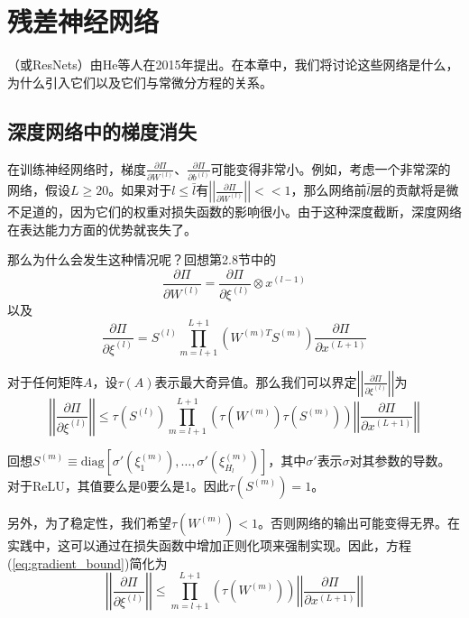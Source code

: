 \chapter{残差神经网络}
\label{chap:residual_networks}

（或ResNets）由He等人\cite{he2015}在2015年提出。在本章中，我们将讨论这些网络是什么，为什么引入它们以及它们与常微分方程的关系。

\section{深度网络中的梯度消失}
\label{sec:vanishing_gradients}

在训练神经网络时，梯度$\frac{\partial\Pi}{\partial W^{(l)}}$、$\frac{\partial\Pi}{\partial b^{(l)}}$可能变得非常小。例如，考虑一个非常深的网络，假设$L \geq 20$。如果对于$l \leq \bar{l}$有$\left|\left|\frac{\partial\Pi}{\partial W^{(l)}}\right|\right| << 1$，那么网络前$\bar{l}$层的贡献将是微不足道的，因为它们的权重对损失函数的影响很小。由于这种深度截断，深度网络在表达能力方面的优势就丧失了。

那么为什么会发生这种情况呢？回想第2.8节中的
\begin{equation}
\frac{\partial\Pi}{\partial W^{(l)}} = \frac{\partial\Pi}{\partial\xi^{(l)}} \otimes x^{(l-1)}
\end{equation}
以及
\begin{equation}
\frac{\partial\Pi}{\partial\xi^{(l)}} = S^{(l)} \prod_{m=l+1}^{L+1} \left(W^{(m)T} S^{(m)}\right) \frac{\partial\Pi}{\partial x^{(L+1)}}
\label{eq:gradient_chain}
\end{equation}

对于任何矩阵$A$，设$\tau(A)$表示最大奇异值。那么我们可以界定$\left|\left|\frac{\partial\Pi}{\partial\xi^{(l)}}\right|\right|$为
\begin{equation}
\left|\left|\frac{\partial\Pi}{\partial\xi^{(l)}}\right|\right| \leq \tau(S^{(l)}) \prod_{m=l+1}^{L+1} \left(\tau(W^{(m)}) \tau(S^{(m)})\right) \left|\left|\frac{\partial\Pi}{\partial x^{(L+1)}}\right|\right|
\label{eq:gradient_bound}
\end{equation}

回想$S^{(m)} \equiv \text{diag}[\sigma'(\xi_1^{(m)}), \ldots, \sigma'(\xi_{H_l}^{(m)})]$，其中$\sigma'$表示$\sigma$对其参数的导数。对于ReLU，其值要么是0要么是1。因此$\tau(S^{(m)}) = 1$。

另外，为了稳定性，我们希望$\tau(W^{(m)}) < 1$。否则网络的输出可能变得无界。在实践中，这可以通过在损失函数中增加正则化项来强制实现。因此，方程(\ref{eq:gradient_bound})简化为
\begin{equation}
\left|\left|\frac{\partial\Pi}{\partial\xi^{(l)}}\right|\right| \leq \prod_{m=l+1}^{L+1} \left(\tau(W^{(m)})\right) \left|\left|\frac{\partial\Pi}{\partial x^{(L+1)}}\right|\right|
\label{eq:gradient_bound_simplified}
\end{equation}

